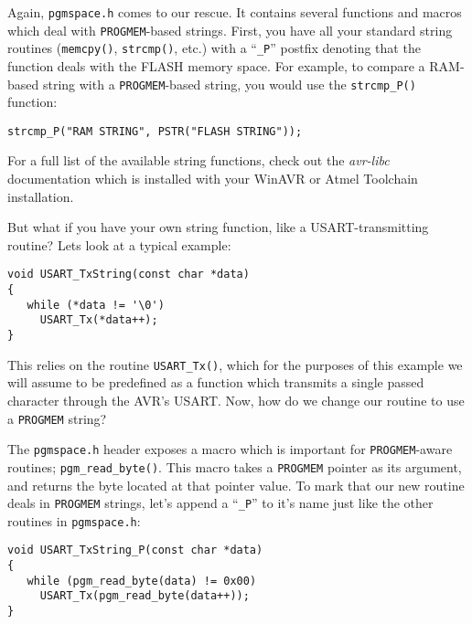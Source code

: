 \documentclass[a4paper,oneside,notitlepage]{book}
\begin{document}
Again, \lstinline{pgmspace.h} comes to our rescue. It contains several functions and macros which deal with \lstinline{PROGMEM}-based strings. First, you have all your standard string routines (\lstinline{memcpy()}, \lstinline{strcmp()}, etc.) with a ``\lstinline{_P}'' postfix denoting that the function deals with the FLASH memory space. For example, to compare a RAM-based string with a \lstinline{PROGMEM}-based string, you would use the \lstinline{strcmp_P()} function:

\begin{center}
\begin{lstlisting}
strcmp_P("RAM STRING", PSTR("FLASH STRING"));
\end{lstlisting}
\end{center}

For a full list of the available string functions, check out the \textit{avr-libc} documentation which is installed with your WinAVR or Atmel Toolchain installation.

But what if you have your own string function, like a USART-transmitting routine? Lets look at a typical example:

\begin{center}
\begin{lstlisting}
void USART_TxString(const char *data)
{
   while (*data != '\0')
     USART_Tx(*data++);
}
\end{lstlisting}
\end{center}

This relies on the routine \lstinline{USART_Tx()}, which for the purposes of this example we will assume to be predefined as a function which transmits a single passed character through the AVR's USART. Now, how do we change our routine to use a \lstinline{PROGMEM} string?

The \lstinline{pgmspace.h} header exposes a macro which is important for \lstinline{PROGMEM}-aware routines; \lstinline{pgm_read_byte()}. This macro takes a \lstinline{PROGMEM} pointer as its argument, and returns the byte located at that pointer value. To mark that our new routine deals in \lstinline{PROGMEM} strings, let's append a ``\lstinline{_P}'' to it's name just like the other routines in \lstinline{pgmspace.h}:

\begin{center}
\begin{lstlisting}
void USART_TxString_P(const char *data)
{
   while (pgm_read_byte(data) != 0x00)
     USART_Tx(pgm_read_byte(data++));
}
\end{lstlisting}
\end{center}
\end{document}
